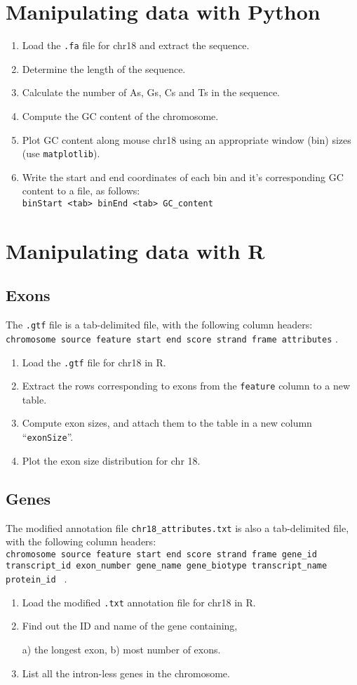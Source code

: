 \documentclass[a4paper,11pt]{article}
\begin{document}
\section{Manipulating data with Python}
\begin{enumerate}
\item Load the \texttt{.fa} file for chr18 and extract the sequence.
\item Determine the length of the sequence.
\item Calculate the number of As, Gs, Cs and Ts in the sequence.
\item Compute the GC content of the chromosome.
\item Plot GC content along mouse chr18 using an appropriate window (bin) sizes (use \texttt{matplotlib}).
\item Write the start and end coordinates of each bin and it's corresponding GC content to a file, as follows: \\
\texttt {binStart <tab> binEnd <tab> GC\_content}
\end{enumerate}



\section{Manipulating data with R}
\subsection{Exons}
The \texttt{.gtf} file is a tab-delimited file, with the following column headers: \\
\texttt {chromosome source feature start end score strand frame attributes} .
\begin{enumerate}
\item Load the \texttt{.gtf} file for chr18 in R.
\item Extract the rows corresponding to exons from the \texttt{feature} column to a new table.
\item Compute exon sizes, and attach them to the table in a new column ``\texttt{exonSize}''.
\item Plot the exon size distribution for chr 18.
\end{enumerate}
\subsection{Genes}
The modified annotation file \texttt{chr18\_attributes.txt} is also a tab-delimited file, with the \indent following column headers: \\
\texttt {chromosome source feature start end score strand frame gene\_id transcript\_id exon\_number gene\_name gene\_biotype transcript\_name protein\_id } .
\begin{enumerate}
\normalsize
\item Load the modified \texttt{.txt} annotation file for chr18 in R.
\item Find out the ID and name of the gene containing,

 a) the longest exon, b) most number of exons.
\item List all the intron-less genes in the chromosome.
\end{enumerate}
\end{document}
